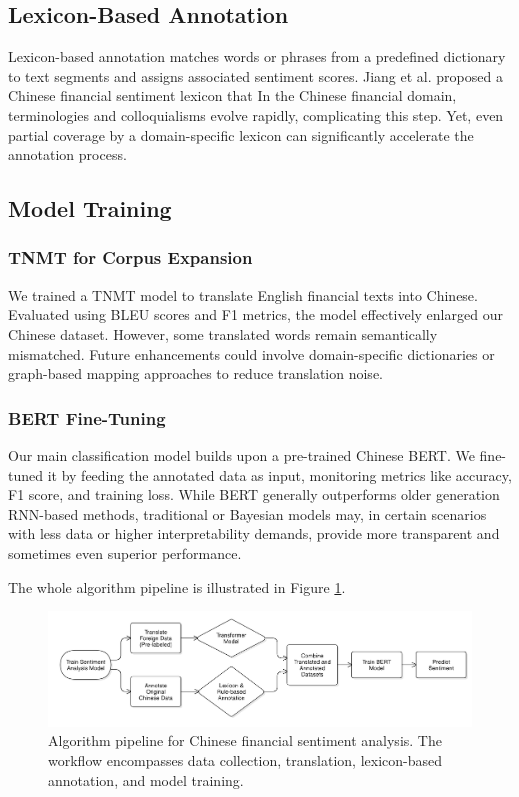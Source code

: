\documentclass[12pt]{article}
\begin{document}
\subsection{Lexicon-Based Annotation}

Lexicon-based annotation matches words or phrases from a predefined dictionary to text segments and assigns associated sentiment scores. Jiang et al. \cite{ref3, ref4} proposed a Chinese financial sentiment lexicon that In the Chinese financial domain, terminologies and colloquialisms evolve rapidly, complicating this step. Yet, even partial coverage by a domain-specific lexicon can significantly accelerate the annotation process. 

\subsection{Model Training}
\subsubsection{TNMT for Corpus Expansion}
\label{subsec:TNMTperf}
We trained a TNMT model to translate English financial texts into Chinese. Evaluated using BLEU scores and F1 metrics, the model effectively enlarged our Chinese dataset. However, some translated words remain semantically mismatched. Future enhancements could involve domain-specific dictionaries or graph-based mapping approaches to reduce translation noise.

\subsubsection{BERT Fine-Tuning}
Our main classification model builds upon a pre-trained Chinese BERT. We fine-tuned it by feeding the annotated data as input, monitoring metrics like accuracy, F1 score, and training loss. While BERT generally outperforms older generation RNN-based methods, traditional or Bayesian models may, in certain scenarios with less data or higher interpretability demands, provide more transparent and sometimes even superior performance.

The whole algorithm pipeline is illustrated in Figure \ref{fig:pipeline}.\

\begin{figure}[H]
	\centering
	\includegraphics[width=\textwidth]{pipeline.png}
	\caption{Algorithm pipeline for Chinese financial sentiment analysis. The workflow encompasses data collection, translation, lexicon-based annotation, and model training.}
	\label{fig:pipeline}
\end{figure}
\end{document}
